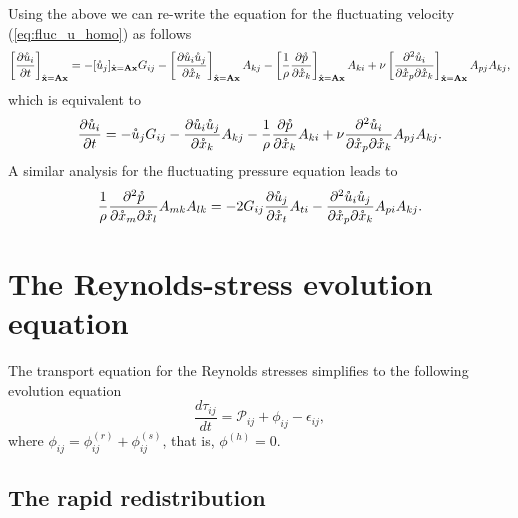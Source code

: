 \documentclass[oneside,a4paper,11pt]{report}
\newcommand{\rs}{\tau}          %
\newcommand{\redi}{\phi}        %
\begin{document}
Using the above we can re-write the equation for the fluctuating velocity (\ref{eq:fluc_u_homo}) as follows
\begin{equation}
\left [ \frac{\partial \mathring{u}_i }{\partial t } \right ]_{\mathring{\mathbf{x}} = \mathbf{A} \mathbf{x}} = -[\mathring{u}_j]_{\mathring{\mathbf{x}} = \mathbf{A} \mathbf{x}} G_{ij} - \left [ \frac{\partial \mathring{u}_i \mathring{u}_j}{\partial \mathring{x}_k} \right ]_{\mathring{\mathbf{x}} = \mathbf{A}\mathbf{x}} A_{kj} - \left [ \frac{1}{\rho} \frac{\partial \mathring{p} }{\partial \mathring{x}_k} \right ]_{\mathring{\mathbf{x}} = \mathbf{A}\mathbf{x} } A_{ki} + \nu \left [ \frac{ \partial^2 \mathring{u}_i}{\partial \mathring{x}_p \partial \mathring{x}_k} \right ]_{\mathring{\mathbf{x}} = \mathbf{A} \mathbf{x}} A_{pj} A_{kj},
\end{equation}
which is equivalent to
\begin{equation}
\label{eq:u_lin_tran}
\frac{\partial \mathring{u}_i }{\partial t } = -\mathring{u}_j G_{ij} - \frac{\partial \mathring{u}_i \mathring{u}_j}{\partial \mathring{x}_k} A_{kj} - \frac{1}{\rho} \frac{\partial \mathring{p} }{\partial \mathring{x}_k} A_{ki} + \nu \frac{ \partial^2 \mathring{u}_i}{\partial \mathring{x}_p \partial \mathring{x}_k} A_{pj} A_{kj}.
\end{equation}
A similar analysis for the fluctuating pressure equation leads to
\begin{equation}
\label{eq:p_lin_tran}
\frac{1}{\rho} \frac{\partial^2 \mathring{p} }{\partial \mathring{x}_m \partial \mathring{x}_l} A_{mk} A_{lk} = -2 G_{ij} \frac{\partial \mathring{u}_j }{\partial \mathring{x}_t} A_{ti} - \frac{\partial^2 \mathring{u}_i \mathring{u}_j}{\partial \mathring{x}_p \partial \mathring{x}_k} A_{pi}A_{kj}.
\end{equation}

\section{The Reynolds-stress evolution equation}

The transport equation for the Reynolds stresses simplifies to the following evolution equation
\begin{equation}
\frac{d \rs_{ij}}{dt} = \mathcal{P}_{ij} +\redi_{ij} - \epsilon_{ij},
\end{equation}
where $\redi_{ij} = \redi^{(r)}_{ij} + \redi^{(s)}_{ij}$, that is, $\redi^{(h)} = 0$.

\subsection{The rapid redistribution}
\end{document}
